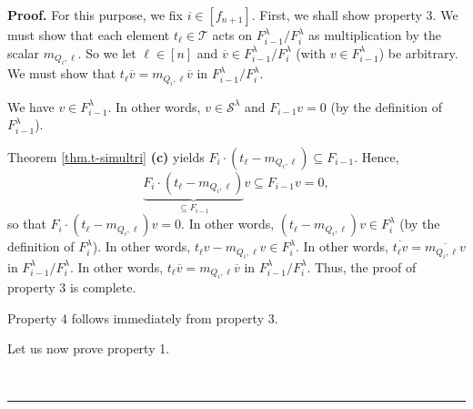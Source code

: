 \documentclass[numbers=enddot,12pt,final,onecolumn,notitlepage]{scrartcl}%
\theoremstyle{definition}
\newenvironment{proof}[1][Proof]{\noindent\textbf{#1.} }{\ \rule{0.5em}{0.5em}}
\begin{document}
\begin{proof}
For this purpose, we fix $i\in\left[  f_{n+1}\right]  $. First, we shall show
property 3. We must show that each element $t_{\ell}\in\mathcal{T}$ acts on
$F_{i-1}^{\lambda}/F_{i}^{\lambda}$ as multiplication by the scalar
$m_{Q_{i},\ell}$. So we let $\ell\in\left[  n\right]  $ and $\overline{v}\in
F_{i-1}^{\lambda}/F_{i}^{\lambda}$ (with $v\in F_{i-1}^{\lambda}$) be
arbitrary. We must show that $t_{\ell}\overline{v}=m_{Q_{i},\ell}\overline{v}$
in $F_{i-1}^{\lambda}/F_{i}^{\lambda}$.

We have $v\in F_{i-1}^{\lambda}$. In other words, $v\in\mathcal{S}^{\lambda}$
and $F_{i-1}v=0$ (by the definition of $F_{i-1}^{\lambda}$).

Theorem \ref{thm.t-simultri} \textbf{(c)} yields $F_{i}\cdot\left(  t_{\ell
}-m_{Q_{i},\ell}\right)  \subseteq F_{i-1}$. Hence,%
\[
\underbrace{F_{i}\cdot\left(  t_{\ell}-m_{Q_{i},\ell}\right)  }_{\subseteq
F_{i-1}}v\subseteq F_{i-1}v=0,
\]
so that $F_{i}\cdot\left(  t_{\ell}-m_{Q_{i},\ell}\right)  v=0$. In other
words, $\left(  t_{\ell}-m_{Q_{i},\ell}\right)  v\in F_{i}^{\lambda}$ (by the
definition of $F_{i}^{\lambda}$). In other words, $t_{\ell}v-m_{Q_{i},\ell
}v\in F_{i}^{\lambda}$. In other words, $\overline{t_{\ell}v}=\overline
{m_{Q_{i},\ell}v}$ in $F_{i-1}^{\lambda}/F_{i}^{\lambda}$. In other words,
$t_{\ell}\overline{v}=m_{Q_{i},\ell}\overline{v}$ in $F_{i-1}^{\lambda}%
/F_{i}^{\lambda}$. Thus, the proof of property 3 is complete.

Property 4 follows immediately from property 3.

Let us now prove property 1.


\end{proof}
\end{document}
